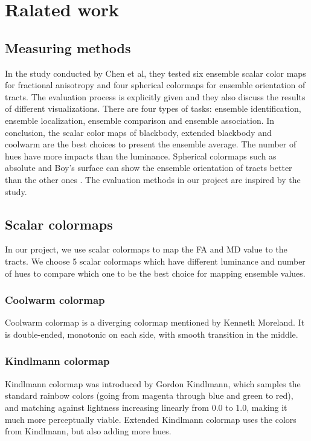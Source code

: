 \documentclass[hyperref, plainreport, noproblem]{cgvpub1}
\begin{document}
\chapter{Ralated work}


\section{Measuring methods}
In the study conducted by Chen et al, they tested six ensemble scalar color maps for fractional anisotropy and four spherical colormaps for ensemble orientation of tracts. The evaluation process is explicitly given and they also discuss the results of different visualizations. There are four types of tasks: ensemble identification, ensemble localization, ensemble comparison and ensemble association. In conclusion, the scalar color maps of blackbody, extended blackbody and coolwarm are the best choices to present the ensemble average. The number of hues have more impacts than the luminance. Spherical colormaps such as absolute and Boy’s surface can show the ensemble orientation of tracts better than the other ones \cite{moreland2019}. The evaluation methods in our project are inspired by the study.


\section{Scalar colormaps}

In our project, we use scalar colormaps to map the FA and MD value to the tracts. We choose 5 scalar colormaps which have different luminance and number of hues to compare which one to be the best choice for mapping ensemble values.

\subsection{Coolwarm colormap}
Coolwarm colormap is a diverging colormap mentioned by Kenneth Moreland. It is double-ended, monotonic on each side, with smooth transition in the middle.

\subsection{Kindlmann colormap}
Kindlmann colormap was introduced by Gordon Kindlmann, which samples the standard rainbow colors (going from magenta through blue and green to red), and matching against lightness increasing linearly from 0.0 to 1.0, \cite{kindlmann} making it much more perceptually viable. Extended Kindlmann colormap uses the colors from Kindlmann, but also adding more hues.
\end{document}
